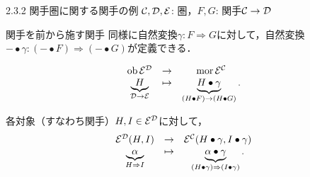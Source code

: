 \documentclass[uplatex,a4paper,dvipdfmx,aspectratio=169,10pt]{beamer}
\begin{document}
\begin{frame}[fragile]{2.3.2 関手圏に関する関手の例}
    $\mathcal{C}, \mathcal{D}, \mathcal{E}$: 圏，$F, G$: 関手$\mathcal{C} \to \mathcal{D}$
    \begin{exampleblock}{ 関手を前から施す関手}
        同様に自然変換$\gamma \colon F \Rightarrow G$に対して，自然変換$- \bullet \gamma \colon (- \bullet F) \Rightarrow (- \bullet G)$が定義できる．
        \begin{description}[対象への作用:]
            \item[対象への作用:]
                \begin{equation*}
                    \begin{array}{ccc}
                        \operatorname{{\mathrm{ob}}} \mathcal{E}^{\mathcal{D}} & \to & \operatorname{{\mathrm{mor}}} \mathcal{E}^{\mathcal{C}}  \\
                        \underbrace{H}_{\mathcal{D} \to \mathcal{E}} & \mapsto & \underbrace{H \bullet \gamma}_{(H \bullet F) \to (H \bullet G)}.
                    \end{array}
                \end{equation*}
            \item[射への作用:] 各対象（すなわち関手）$H, I \in \mathcal{E}^{\mathcal{D}}$に対して，
                \begin{equation*}
                    \begin{array}{ccc}
                        \mathcal{E}^{\mathcal{D}}(H, I)& \to & \mathcal{E}^{\mathcal{C}}(H \bullet \gamma, I \bullet \gamma)  \\
                        \underbrace{\alpha}_{H \Rightarrow I} & \mapsto & \underbrace{\alpha \bullet \gamma}_{(H \bullet \gamma) \Rightarrow (I \bullet \gamma)}.
                    \end{array}
                \end{equation*}
        \end{description}
    \end{exampleblock}
\end{frame}
\end{document}
